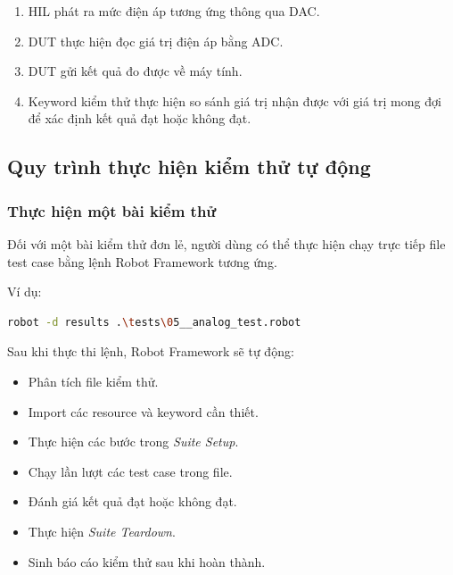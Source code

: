 \begin{enumerate}

    \item HIL phát ra mức điện áp tương ứng thông qua DAC.
    
    \item DUT thực hiện đọc giá trị điện áp bằng ADC.
    
    \item DUT gửi kết quả đo được về máy tính.
    
    \item Keyword kiểm thử thực hiện so sánh giá trị nhận được với giá trị mong đợi để xác định kết quả đạt hoặc không đạt.

\end{enumerate}

\subsection{Quy trình thực hiện kiểm thử tự động}
\subsubsection{Thực hiện một bài kiểm thử}

Đối với một bài kiểm thử đơn lẻ, người dùng có thể thực hiện chạy trực tiếp file test case bằng lệnh Robot Framework tương ứng.

Ví dụ:

\begin{lstlisting}[language=bash]
robot -d results .\tests\05__analog_test.robot
\end{lstlisting}

Sau khi thực thi lệnh, Robot Framework sẽ tự động:

\begin{itemize}

    \item Phân tích file kiểm thử.
    
    \item Import các resource và keyword cần thiết.
    
    \item Thực hiện các bước trong \textit{Suite Setup}.
    
    \item Chạy lần lượt các test case trong file.
    
    \item Đánh giá kết quả đạt hoặc không đạt.
    
    \item Thực hiện \textit{Suite Teardown}.
    
    \item Sinh báo cáo kiểm thử sau khi hoàn thành.

\end{itemize}


